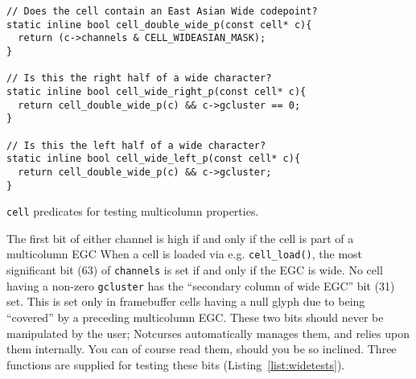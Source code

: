 \begin{listing}[!htb]
\begin{verbatim}
// Does the cell contain an East Asian Wide codepoint?
static inline bool cell_double_wide_p(const cell* c){
  return (c->channels & CELL_WIDEASIAN_MASK);
}

// Is this the right half of a wide character?
static inline bool cell_wide_right_p(const cell* c){
  return cell_double_wide_p(c) && c->gcluster == 0;
}

// Is this the left half of a wide character?
static inline bool cell_wide_left_p(const cell* c){
  return cell_double_wide_p(c) && c->gcluster;
}
\end{verbatim}
\caption{\texttt{cell} predicates for testing multicolumn properties.}
\label{list:widetests}
\end{listing}

The first bit of either channel is high if and only if the cell is part of a
multicolumn EGC When a cell is loaded via e.g. \texttt{cell\_load()}, the most
significant bit (63) of \texttt{channels} is set if and only if the EGC is wide. No
cell having a non-zero \texttt{gcluster} has the ``secondary column of wide EGC''
bit (31) set. This is set only in framebuffer cells having a null glyph due to
being ``covered'' by a preceding multicolumn EGC. These two bits should never
be manipulated by the user; Notcurses automatically manages them, and relies upon
them internally. You can of course read them, should you be so inclined. Three
functions are supplied for testing these bits (Listing~\ref{list:widetests}).

